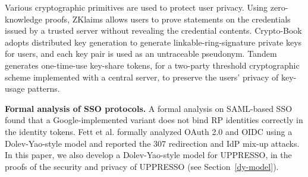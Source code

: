 
Various cryptographic primitives are used to protect user privacy.
Using zero-knowledge proofs,
ZKlaims \cite{zklaim} allows users to prove statements on the credentials issued by a trusted server without revealing the credential contents.
Crypto-Book \cite{crypto-book} adopts distributed key generation to generate linkable-ring-signature private keys for users,
    and each key pair is used as an untraceable pseudonym.
Tandem \cite{tandem} generates one-time-use key-share tokens,
    for a two-party threshold cryptographic scheme implemented with a central server,
to preserve the users' privacy of key-usage patterns.



\noindent\textbf{Formal analysis of SSO protocols.}
A formal analysis on SAML-based SSO \cite{ArmandoCCCT08} found that a Google-implemented variant does not bind RP identities correctly in the identity tokens.
Fett et al. \cite{FettKS16, FettKS17} formally analyzed OAuth 2.0 and OIDC using a Dolev-Yao-style model \cite{FettKS14} and reported the 307 redirection and IdP mix-up attacks.
In this paper, we also develop a Dolev-Yao-style model for UPPRESSO,
in the proofs of the security and privacy of UPPRESSO (see Section~\ref{dy-model}).


